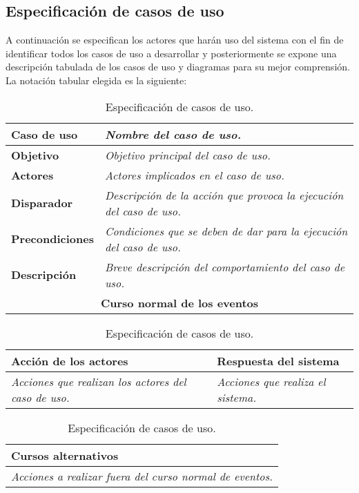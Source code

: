 \documentclass[twoside,a4paper,11pt]{book}
\begin{document}
\subsection{Especificación de casos de uso}
A continuación se especifican los actores que harán uso del sistema con el fin de identificar todos los casos de uso a desarrollar y posteriormente se
expone una descripción tabulada de los casos de uso y diagramas para su mejor comprensión.\\
La notación tabular elegida es la siguiente:\\


\begin{table}[!ht]
    \centering
    \begin{tabular}{|p{4cm}|p{11.5cm}|}
    \hline

    \textbf{Caso de uso} & \textit{Nombre del caso de uso.}\\
    \hline

    \textbf{Objetivo} & \textit{Objetivo principal del caso de uso.}\\
    \hline

    \textbf{Actores} & \textit{Actores implicados en el caso de uso.}\\
    \hline

    \textbf{Disparador} & \textit{Descripción de la acción que provoca la ejecución del caso de uso.}\\
    \hline

    \textbf{Precondiciones} & \textit{Condiciones que se deben de dar para la ejecución del caso de uso.}\\
    \hline

    \textbf{Descripción} & \textit{Breve descripción del comportamiento del caso de uso.}\\
    \hline

    \multicolumn{2}{|c|}{\textbf{Curso normal de los eventos}}\\
    \hline

    \end{tabular}
    \begin{tabular}{|p{7.75cm}|p{7.75cm}|}
    \hspace{2cm}\textbf{Acción de los actores} & \hspace{1.75cm}\textbf{Respuesta del sistema}\\
    \hline

    \textit{Acciones que realizan los actores del caso de uso.} & \textit{Acciones que realiza el sistema.}\\
    \hline

    \end{tabular}

    \begin{tabular}{|p{15.9cm}|}
      \hspace{6cm}\textbf{Cursos alternativos}\\
      \hline

    \textit{Acciones a realizar fuera del curso normal de eventos.}\\
    \hline
    \end{tabular}
    \caption{Especificación de casos de uso.}
\end{table}
\end{document}
